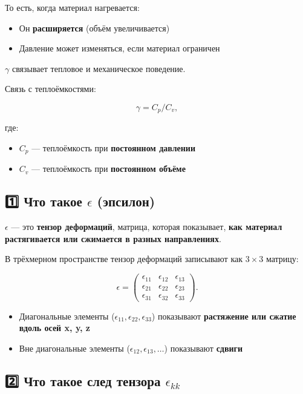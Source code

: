 То есть, когда материал нагревается:

\begin{itemize}
    \item Он \textbf{расширяется} (объём увеличивается)
    \item Давление может изменяться, если материал ограничен
\end{itemize}

\(\gamma\) связывает тепловое и механическое поведение.  

Связь с теплоёмкостями:

\[
\gamma = C_p /C_v,
\]

где:  
\begin{itemize}
    \item \(C_p\) — теплоёмкость при \textbf{постоянном давлении}
    \item \(C_v\) — теплоёмкость при \textbf{постоянном объёме}
\end{itemize}

\subsection{1️⃣ Что такое \(\epsilon\) (эпсилон)}

\(\epsilon\) — это \textbf{тензор деформаций}, матрица, которая показывает, \textbf{как материал растягивается или сжимается в разных направлениях}.

В трёхмерном пространстве тензор деформаций записывают как \(3 \times 3\) матрицу:

\[
\epsilon =
\begin{pmatrix}
\epsilon_{11} & \epsilon_{12} & \epsilon_{13} \\
\epsilon_{21} & \epsilon_{22} & \epsilon_{23} \\
\epsilon_{31} & \epsilon_{32} & \epsilon_{33}
\end{pmatrix}.
\]

\begin{itemize}
    \item Диагональные элементы (\(\epsilon_{11}, \epsilon_{22}, \epsilon_{33}\)) показывают \textbf{растяжение или сжатие вдоль осей x, y, z}
    \item Вне диагональные элементы (\(\epsilon_{12}, \epsilon_{13}, \dots\)) показывают \textbf{сдвиги}
\end{itemize}

\subsection{2️⃣ Что такое след тензора \(\epsilon_{kk}\)}

